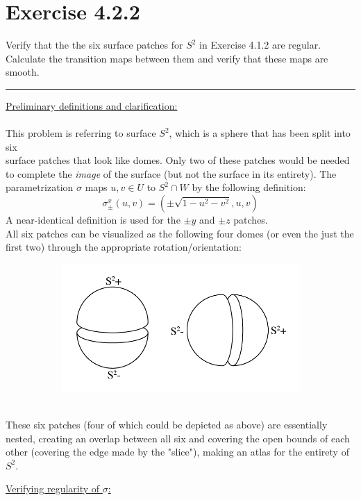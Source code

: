 \documentclass[12pt]{article}
\begin{document}
\maketitle

\section*{Exercise 4.2.2}
Verify that the the six surface patches for $S^2$ in Exercise 4.1.2 are regular. Calculate the transition maps between them and verify that these maps are smooth.

\vspace{1cm}
\hrule
\vspace{1cm}
\noindent
\underline{Preliminary definitions and clarification:}\\\\
This problem is referring to surface $S^2$, which is a sphere that has been split into six \\ surface patches that look like domes. Only two of these patches would be needed to complete the \emph{image} of the surface (but not the surface in its entirety). The parametrization $\sigma$ maps $u,v \in U$ to $S^2 \cap W$ by the following definition:
$$
\sigma^{x}_{\pm}(u,v) = (\pm \sqrt{1-u^2-v^2}, u ,v)
$$
\indent
A near-identical definition is used for the $\pm y$ and $\pm z$ patches.\\
\indent
All six patches can be visualized as the following four domes (or even the just the first two) through the appropriate rotation/orientation:
\begin{figure}[h!]
  \centering
      \begin{subfigure}[b]{0.5\linewidth}
    \includegraphics[width=\linewidth]{./assets/4-2-2/s2-patches.png}
  \end{subfigure}
  \end{figure}
  \\
These six patches (four of which could be depicted as above) are essentially nested, creating an overlap between all six and covering the open bounds of each other (covering the edge made by the "slice"), making an atlas for the entirety of $S^2$.

\clearpage

\underline{Verifying regularity of $\sigma$:}\\\\
\end{document}
